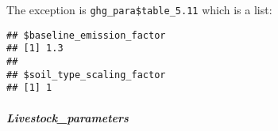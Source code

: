 \documentclass[
]{article}
\newenvironment{Shaded}{\begin{snugshade}}{\end{snugshade}}
\newcommand{\FloatTok}[1]{\textcolor[rgb]{0.00,0.00,0.81}{#1}}
\newcommand{\NormalTok}[1]{#1}
\newcommand{\SpecialCharTok}[1]{\textcolor[rgb]{0.00,0.00,0.00}{#1}}
\begin{document}
The exception is \texttt{ghg\_para\$table\_5.11} which is a list:

\begin{Shaded}
\end{Shaded}

\begin{verbatim}
## $baseline_emission_factor
## [1] 1.3
## 
## $soil_type_scaling_factor
## [1] 1
\end{verbatim}

\hypertarget{livestock_parameters}{%
\subparagraph{Livestock\_parameters}\label{livestock_parameters}}

\begin{Shaded}
\end{Shaded}
\end{document}
